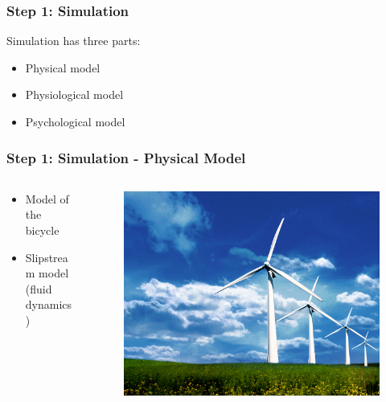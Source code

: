 \documentclass{beamer}
\begin{document}
\begin{frame}
\frametitle{Step 1: Simulation}
Simulation has three parts: \\
\pause
\vspace{0.7cm}
\begin{itemize}
\item Physical model
\pause
\vspace{0.7cm}
\item Physiological model
\pause
\vspace{0.7cm}
\item Psychological model
\end{itemize}
\end{frame}

\begin{frame}
\frametitle{Step 1: Simulation - Physical Model}

\begin{columns}
  \begin{column}{0.6\textwidth}
    \begin{itemize}
    \item Model of the bicycle
      \vspace{0.2cm}
    \item Slipstream model (fluid dynamics)
    \end{itemize}
  \end{column}
  
  \begin{column}{0.4\textwidth}
    \begin{figure}[ht!]
      \includegraphics[scale=0.1]{physical.jpg}
    \end{figure} 
  \end{column}
\end{columns}

\end{frame}
\end{document}

